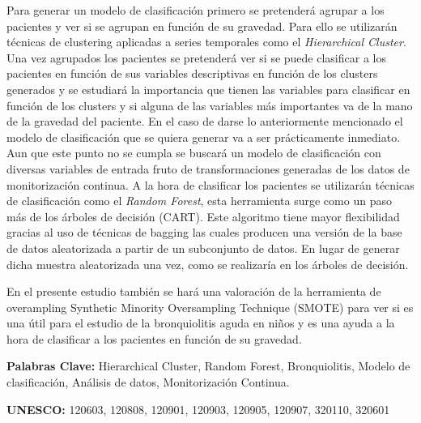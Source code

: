 \documentclass[a4paper, 11pt, spanish, twoside]{article}
\newcommand\blankpage{%
    \null
    \thispagestyle{empty}%
    \newpage}
\begin{document}
Para generar un modelo de clasificación primero se pretenderá agrupar a los pacientes y ver si se agrupan en función de su gravedad. Para ello se utilizarán técnicas de clustering aplicadas a series temporales como el \textit{Hierarchical Cluster}. Una vez agrupados los pacientes se pretenderá ver si se puede clasificar a los pacientes en función de sus variables descriptivas en función de los clusters generados y se estudiará la importancia que tienen las variables para clasificar en función de los clusters y si alguna de las variables más importantes va de la mano de la gravedad del paciente. En el caso de darse lo anteriormente mencionado el modelo de clasificación que se quiera generar va a ser prácticamente inmediato. Aun que este punto no se cumpla se buscará un modelo de clasificación con diversas variables de entrada fruto de transformaciones generadas de los datos de monitorización continua. A la hora de clasificar los pacientes se utilizarán técnicas de clasificación como el \textit{Random Forest}, esta herramienta surge como un paso más de los árboles de decisión (CART). Este algoritmo tiene mayor flexibilidad gracias al uso de técnicas de bagging las cuales producen una versión de la base de datos aleatorizada a partir de un subconjunto de datos. En lugar de generar dicha muestra aleatorizada una vez, como se realizaría en los árboles de decisión.

En el presente estudio también se hará una valoración de la herramienta de overampling Synthetic Minority Oversampling Technique (SMOTE) para ver si es una útil para el estudio de la bronquiolitis aguda en niños y es una ayuda a la hora de clasificar a los pacientes en función de su gravedad.

\textbf{Palabras Clave:} Hierarchical Cluster, Random Forest, Bronquiolitis, Modelo de clasificación, Análisis de datos, Monitorización Continua.  

\textbf{UNESCO:} 120603, 120808, 120901, 120903, 120905, 120907, 320110, 320601

\afterpage{\blankpage} %




\newpage

\renewcommand*\contentsname{ÍNDICE} %
\end{document}
